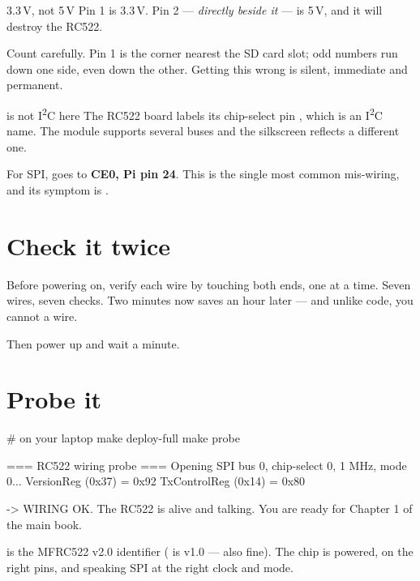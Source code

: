 \begin{trap}{3.3\,V, not 5\,V}
Pin 1 is 3.3\,V. Pin 2 --- \emph{directly beside it} --- is 5\,V, and it will
destroy the RC522.

Count carefully. Pin 1 is the corner nearest the SD card slot; odd numbers run
down one side, even down the other. Getting this wrong is silent, immediate and
permanent.
\end{trap}

\begin{trap}{ is not I\textsuperscript{2}C here}
The RC522 board labels its chip-select pin , which is an
I\textsuperscript{2}C name. The module supports several buses and the silkscreen
reflects a different one.

For SPI,  goes to \textbf{CE0, Pi pin 24}. This is the single most
common mis-wiring, and its symptom is .
\end{trap}

\section{Check it twice}

Before powering on, verify each wire by touching both ends, one at a time. Seven
wires, seven checks. Two minutes now saves an hour later --- and unlike code,
you cannot  a wire.

Then power up and wait a minute.

\section{Probe it}

\begin{shell}
# on your laptop
make deploy-full
make probe
\end{shell}

\begin{verifybox}
\begin{trace}
=== RC522 wiring probe ===
Opening SPI bus 0, chip-select 0, 1 MHz, mode 0...
VersionReg   (0x37) = 0x92
TxControlReg (0x14) = 0x80

  -> WIRING OK. The RC522 is alive and talking.
     You are ready for Chapter 1 of the main book.
\end{trace}
\end{verifybox}

 is the MFRC522 v2.0 identifier ( is v1.0 --- also fine).
The chip is powered, on the right pins, and speaking SPI at the right clock and
mode.

